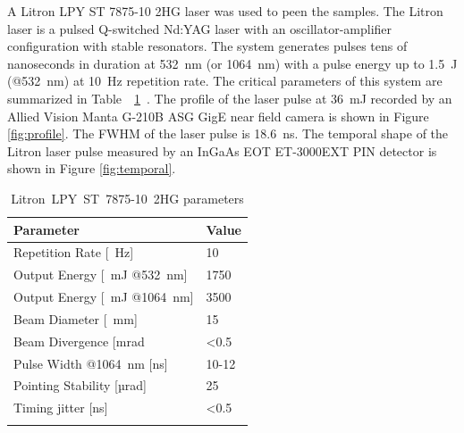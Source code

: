 \documentclass[sn-nature]{sn-jnl}%
\theoremstyle{thmstyleone}%
\theoremstyle{thmstyletwo}%
\theoremstyle{thmstylethree}%
\begin{document}
    A Litron LPY ST 7875-10 2HG laser was used to peen the samples. The Litron laser is a pulsed Q-switched Nd:YAG laser with an oscillator-amplifier configuration with stable resonators. The system generates pulses tens of nanoseconds in duration at \SI{532}{\nano\meter} (or \SI{1064}{\nano\meter}) with a pulse energy up to \SI{1.5}{\joule } (@\SI{532}{\nano\meter}) at \SI{10}{\hertz} repetition rate. The critical parameters of this system are summarized in Table~~\ref{tab:litronparameters}~\cite{litron}.  The profile of the laser pulse at \SI{36}{\milli\joule} recorded by an Allied Vision Manta G-210B ASG GigE near field camera is shown in Figure \ref{fig:profile}. The FWHM of the laser pulse is \SI{18.6}{\ns}. The temporal shape of the Litron laser pulse measured by an InGaAs EOT ET-3000EXT PIN detector is shown in Figure \ref{fig:temporal}.



    \begin{table}[h!]
    \caption{Litron~LPY~ST~7875-10~2HG parameters}\label{tab:litronparameters}%
    \begin{tabular}{@{}ll@{}}
    \toprule    
    Parameter & Value  \\
    \midrule
    Repetition Rate [\SI{}{\hertz}] & 10    \\
    Output Energy [\SI{}{\milli\joule}  @\SI{532}{\nano\meter}] & 1750\footnotemark[1]    \\
    Output Energy [\SI{}{\milli\joule}  @\SI{1064}{\nano\meter}] & 3500 \\
    Beam Diameter [\SI[]{}{\mm}] & 15    \\
    Beam Divergence [mrad & \textless 0.5\footnotemark[2]    \\
    Pulse Width @\SI{1064}{\nano\meter} [ns] & 10-12    \\
    Pointing Stability [µrad] & 25\footnotemark[3]      \\
    Timing jitter [ns] & \textless 0.5\footnotemark[4]      \\
    \botrule
    \end{tabular}
    \end{table}

\end{document}
